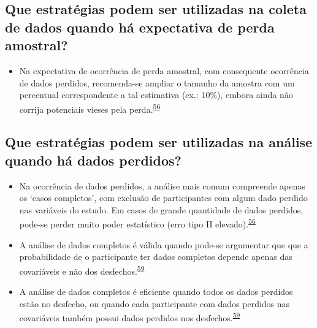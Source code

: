 \documentclass[
  a4paper,
]{book}
\providecommand{\tightlist}{%
  \setlength{\itemsep}{0pt}\setlength{\parskip}{0pt}}
\begin{document}
\hypertarget{que-estratuxe9gias-podem-ser-utilizadas-na-coleta-de-dados-quando-huxe1-expectativa-de-perda-amostral}{%
\subsection{Que estratégias podem ser utilizadas na coleta de dados quando há expectativa de perda amostral?}\label{que-estratuxe9gias-podem-ser-utilizadas-na-coleta-de-dados-quando-huxe1-expectativa-de-perda-amostral}}

\begin{itemize}
\tightlist
\item
  Na expectativa de ocorrência de perda amostral, com consequente ocorrência de dados perdidos, recomenda-se ampliar o tamanho da amostra com um percentual correspondente a tal estimativa (ex.: 10\%), embora ainda não corrija potenciais vieses pela perda.\textsuperscript{\protect\hyperlink{ref-Altman2007}{56}}
\end{itemize}

\hypertarget{que-estratuxe9gias-podem-ser-utilizadas-na-anuxe1lise-quando-huxe1-dados-perdidos}{%
\subsection{Que estratégias podem ser utilizadas na análise quando há dados perdidos?}\label{que-estratuxe9gias-podem-ser-utilizadas-na-anuxe1lise-quando-huxe1-dados-perdidos}}

\begin{itemize}
\item
  Na ocorrência de dados perdidos, a análise mais comum compreende apenas os `casos completos', com exclusão de participantes com algum dado perdido nas variáveis do estudo. Em casos de grande quantidade de dados perdidos, pode-se perder muito poder estatístico (erro tipo II elevado).\textsuperscript{\protect\hyperlink{ref-Altman2007}{56}}
\item
  A análise de dados completos é válida quando pode-se argumentar que que a probabilidade de o participante ter dados completos depende apenas das covariáveis e não dos desfechos.\textsuperscript{\protect\hyperlink{ref-carpenter2021}{59}}
\item
  A análise de dados completos é eficiente quando todos os dados perdidos estão no desfecho, ou quando cada participante com dados perdidos nas covariáveis também possui dados perdidos nos desfechos.\textsuperscript{\protect\hyperlink{ref-carpenter2021}{59}}
\end{itemize}
\end{document}
